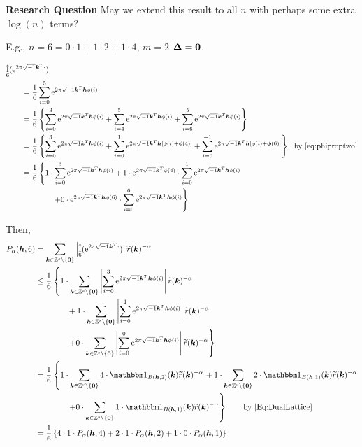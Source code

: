 \documentclass{amsart}
\newcommand{\tr}{\widetilde{r}}
\DeclareMathOperator{\appxint}{\hat{I}}
\begin{document}
\textbf{Research Question}  May we extend this result to all $n$ with perhaps some extra $\log(n)$ terms?

E.g.,  $n =6 = 0\cdot 1 + 1 \cdot 2 + 1 \cdot 4$, $m = 2$ $\boldsymbol{\Delta} = \boldsymbol{0}$.

\begin{align*}
   \MoveEqLeft{\appxint_{6}(\me^{2 \pi \sqrt{-1} \vk^T \cdot})}\\
    &= \frac 1{6} \sum_{i=0}^{5} \me^{2 \pi \sqrt{-1} \vk^T \vh\phi(i)} \\
    &= \frac {1}{6} \left\{ \sum_{i=0}^3 \me^{2 \pi \sqrt{-1} \vk^T \vh\phi(i)} + \sum_{i=4}^5 \me^{2 \pi \sqrt{-1} \vk^T \vh\phi(i)} + \sum_{i=6}^5 \me^{2 \pi \sqrt{-1} \vk^T \vh\phi(i)}  \right\} \\
    &= \frac {1}{6} \left\{ \sum_{i=0}^3 \me^{2 \pi \sqrt{-1} \vk^T \vh\phi(i)} + \sum_{i=0}^1 \me^{2 \pi \sqrt{-1} \vk^T \vh[\phi(i)+\phi(4)]} + \sum_{i=0}^{-1} \me^{2 \pi \sqrt{-1} \vk^T \vh[\phi(i)+\vphi(6)]}  \right\} \ \ \text{by \eqref{eq:phiproptwo}} \\
    &= \frac {1}{6} \left\{ 1\cdot\sum_{i=0}^{3}\me^{2 \pi \sqrt{-1} \vk^T \vh\phi(i)} + 1 \cdot \me^{2 \pi \sqrt{-1} \vk^T \phi(4)} \cdot \sum_{i=0}^{1}\me^{2 \pi \sqrt{-1} \vk^T \vh\phi(i)} \right . \\
    & \qquad \qquad \left . +  0 \cdot
    \me^{2 \pi \sqrt{-1} \vk^T \vh\phi(6)} \cdot \sum_{i=0}^{0}\me^{2 \pi \sqrt{-1} \vk^T \vh\phi(i)} \right\}
\end{align*}

 Then,
\begin{align*}
    P_\alpha(\vh,6) & = \sum_{\vk \in \integers^s \setminus\{\vzero\}}
    \abs{\appxint_6(\me^{2 \pi \sqrt{-1} \vk^T \cdot})}\tr(\vk)^{-\alpha}
    \\
    & \le
    \frac {1}{6} \left\{ 1\cdot\sum_{\vk \in \integers^s \setminus\{\vzero\}} \abs{\sum_{i=0}^{3}\me^{2 \pi \sqrt{-1} \vk^T \vh\phi(i)}} \tr(\vk)^{-\alpha}  \right .
    \\
    & \qquad \qquad + 1  \cdot \sum_{\vk \in \integers^s \setminus\{\vzero\}} \abs{\sum_{i=0}^{1}\me^{2 \pi \sqrt{-1} \vk^T \vh\phi(i)}} \tr(\vk)^{-\alpha}  \\
    & \qquad \qquad \left . +  0
    \cdot \sum_{\vk \in \integers^s \setminus\{\vzero\}} \abs{\sum_{i=0}^{0}\me^{2 \pi \sqrt{-1} \vk^T \vh\phi(i)}}  \tr(\vk)^{-\alpha} \right\}\\
    & =
    \frac {1}{6} \left\{ 1\cdot\sum_{\vk \in \integers^s \setminus\{\vzero\}} 4 \cdot \bbone_{B(\vh,2)}(\vk) \tr(\vk)^{-\alpha}  \right .
    + 1  \cdot \sum_{\vk \in \integers^s \setminus\{\vzero\}}2 \cdot \bbone_{B(\vh,1)}(\vk) \tr(\vk)^{-\alpha}  \\
    & \qquad \qquad \left . +  0
    \cdot \sum_{\vk \in \integers^s \setminus\{\vzero\}} 1 \cdot \bbone_{B(\vh,1)}(\vk)  \tr(\vk)^{-\alpha} \right\} \qquad \text{by \eqref{Eq:DualLattice}}\\
    & = \frac {1}{6} \left\{ 4 \cdot 1 \cdot P_\alpha(\vh,4)+ 2 \cdot 1 \cdot P_\alpha(\vh,2)+ 1 \cdot 0 \cdot P_\alpha(\vh,1) \right\} \\
\end{align*}
\end{document}
